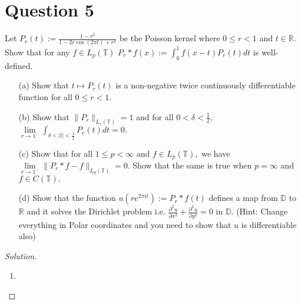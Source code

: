 \section{Question 5}
\horz

Let $P_r(t):=\frac{1-r^2}{1-2r\cos(2\pi t)+r^2}$ be the Poisson kernel where $0\leq r<1$ and $t\in\mathbb{R}.$ Show that for any $f\in L_p(\mathbb T)$ $P_r*f(x):=\int_{0}^1f(x-t)P_r(t)dt$ is well-defined.
\begin{itemize}
\item[(a)] Show that $t\mapsto P_r(t)$ is a non-negative twice continuously differentiable function for all $0\leq r<1.$
\item[(b)] Show that $\|P_r\|_{L_1(\mathbb{T})}=1$ and for all $0<\delta<\frac{1}{2},$ $\lim\limits_{r\to {1^{-}}}\int_{\delta<|t|<\frac{1}{2}}P_r(t)dt=0.$
\item[(c)] Show that for all $1\leq p<\infty$ and $f\in L_p(\mathbb{T}),$ we have $\lim\limits_{r\to {1^{-}}}\|P_r*f-f\|_{L_p(\mathbb{T})}=0.$ Show that the same is true when $p=\infty$ and $f\in C(\mathbb{T}).$
\item[(d)] Show that the function $u(re^{2\pi it}):=P_r*f(t)$ defines a map from $\mathbb{D}$ to $\mathbb{R}$ and it solves the Dirichlet problem i.e. $\frac{\partial^2u}{\partial x^2}+\frac{\partial^2u}{\partial y^2}=0$ in $\mathbb{D}.$ (Hint: Change everything in Polar coordinates and you need to show that $u$ is differentiable also)
\end{itemize}

\horz
\begin{proof}[Solution]
\begin{enumerate}[label=(\alph*)]
\item 
\end{enumerate}
\end{proof}

